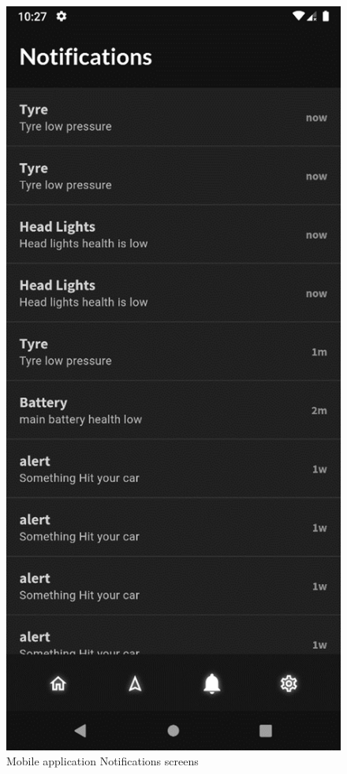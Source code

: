 \documentclass[
12pt,
oneside, 
onehalfspacing, 
nolistspacing, 
parskip, 
chapterinoneline, 
]{AASTCOMPUTER}
\begin{document}
\begin{figure}[!ht]
	\centering
	\includegraphics[scale=1]{Figures/mobileApp/3.png}
  	\caption{Mobile application Notifications screens}
  	\label{fig:Mobile application primary Notifications screens}
\end{figure}
\end{document}
